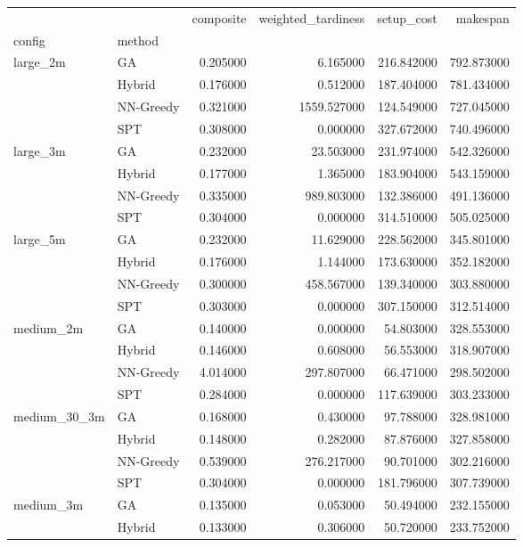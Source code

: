\begin{tabular}{llrrrr}
\toprule
 &  & composite & weighted_tardiness & setup_cost & makespan \\
config & method &  &  &  &  \\
\midrule
\multirow[t]{4}{*}{large_2m} & GA & 0.205000 & 6.165000 & 216.842000 & 792.873000 \\
 & Hybrid & 0.176000 & 0.512000 & 187.404000 & 781.434000 \\
 & NN-Greedy & 0.321000 & 1559.527000 & 124.549000 & 727.045000 \\
 & SPT & 0.308000 & 0.000000 & 327.672000 & 740.496000 \\
\cline{1-6}
\multirow[t]{4}{*}{large_3m} & GA & 0.232000 & 23.503000 & 231.974000 & 542.326000 \\
 & Hybrid & 0.177000 & 1.365000 & 183.904000 & 543.159000 \\
 & NN-Greedy & 0.335000 & 989.803000 & 132.386000 & 491.136000 \\
 & SPT & 0.304000 & 0.000000 & 314.510000 & 505.025000 \\
\cline{1-6}
\multirow[t]{4}{*}{large_5m} & GA & 0.232000 & 11.629000 & 228.562000 & 345.801000 \\
 & Hybrid & 0.176000 & 1.144000 & 173.630000 & 352.182000 \\
 & NN-Greedy & 0.300000 & 458.567000 & 139.340000 & 303.880000 \\
 & SPT & 0.303000 & 0.000000 & 307.150000 & 312.514000 \\
\cline{1-6}
\multirow[t]{4}{*}{medium_2m} & GA & 0.140000 & 0.000000 & 54.803000 & 328.553000 \\
 & Hybrid & 0.146000 & 0.608000 & 56.553000 & 318.907000 \\
 & NN-Greedy & 4.014000 & 297.807000 & 66.471000 & 298.502000 \\
 & SPT & 0.284000 & 0.000000 & 117.639000 & 303.233000 \\
\cline{1-6}
\multirow[t]{4}{*}{medium_30_3m} & GA & 0.168000 & 0.430000 & 97.788000 & 328.981000 \\
 & Hybrid & 0.148000 & 0.282000 & 87.876000 & 327.858000 \\
 & NN-Greedy & 0.539000 & 276.217000 & 90.701000 & 302.216000 \\
 & SPT & 0.304000 & 0.000000 & 181.796000 & 307.739000 \\
\cline{1-6}
\multirow[t]{4}{*}{medium_3m} & GA & 0.135000 & 0.053000 & 50.494000 & 232.155000 \\
 & Hybrid & 0.133000 & 0.306000 & 50.720000 & 233.752000 \\

\end{tabular}

